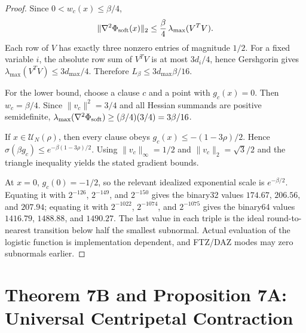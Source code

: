 \documentclass[11pt,a4paper]{article}
\begin{document}
\begin{proof}
Since $0<w_c(x)\le \beta/4$,
\[
\|\nabla^2\Phi_{\rm soft}(x)\|_2
\le \frac\beta4\,\lambda_{\max}(V^TV).
\]
Each row of $V$ has exactly three nonzero entries of magnitude $1/2$. For a fixed variable $i$, the absolute row sum of $V^TV$ is at most $3d_i/4$, hence Gershgorin gives $\lambda_{\max}(V^TV)\le3d_{\max}/4$. Therefore $L_\beta\le3d_{\max}\beta/16$.

For the lower bound, choose a clause $c$ and a point with $g_c(x)=0$. Then $w_c=\beta/4$. Since $\|v_c\|^2=3/4$ and all Hessian summands are positive semidefinite, $\lambda_{\max}(\nabla^2\Phi_{\rm soft})\ge(\beta/4)(3/4)=3\beta/16$.

If $x\in\mathcal U_N(\rho)$, then every clause obeys $g_c(x)\le-(1-3\rho)/2$. Hence $\sigma(\beta g_c)\le e^{-\beta(1-3\rho)/2}$. Using $\|v_c\|_\infty=1/2$ and $\|v_c\|_2=\sqrt3/2$ and the triangle inequality yields the stated gradient bounds.

At $x=0$, $g_c(0)=-1/2$, so the relevant idealized exponential scale is $e^{-\beta/2}$.  Equating it with $2^{-126}$, $2^{-149}$, and $2^{-150}$ gives the binary32 values $174.67$, $206.56$, and $207.94$; equating it with $2^{-1022}$, $2^{-1074}$, and $2^{-1075}$ gives the binary64 values $1416.79$, $1488.88$, and $1490.27$.  The last value in each triple is the ideal round-to-nearest transition below half the smallest subnormal.  Actual evaluation of the logistic function is implementation dependent, and FTZ/DAZ modes may zero subnormals earlier.
\end{proof}

\section{Theorem 7B and Proposition 7A: Universal Centripetal Contraction}
\end{document}
